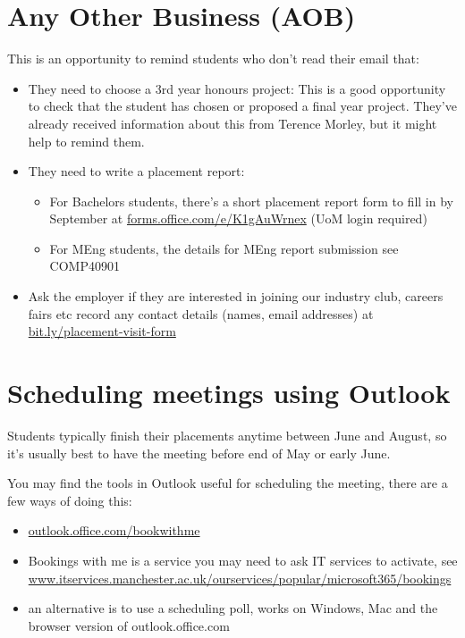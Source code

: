 \documentclass[
]{book}
\providecommand{\tightlist}{%
  \setlength{\itemsep}{0pt}\setlength{\parskip}{0pt}}
\begin{document}
\section{Any Other Business (AOB)}\label{aob}

This is an opportunity to remind students who don't read their email that:

\begin{itemize}
\tightlist
\item
  They need to choose a 3rd year honours project: This is a good opportunity to check that the student has chosen or proposed a final year project. They've already received information about this from Terence Morley, but it might help to remind them.
\item
  They need to write a placement report:

  \begin{itemize}
  \tightlist
  \item
    For Bachelors students, there's a short placement report form to fill in by September at \href{https://forms.office.com/e/K1gAuWrnex}{forms.office.com/e/K1gAuWrnex} (UoM login required)
  \item
    For MEng students, the details for MEng report submission see COMP40901
  \end{itemize}
\item
  Ask the employer if they are interested in joining our industry club, careers fairs etc record any contact details (names, email addresses) at \url{bit.ly/placement-visit-form}
\end{itemize}

\section{Scheduling meetings using Outlook}\label{schedule}

Students typically finish their placements anytime between June and August, so it's usually best to have the meeting before end of May or early June.

You may find the tools in Outlook useful for scheduling the meeting, there are a few ways of doing this:

\begin{itemize}
\tightlist
\item
  \href{https://outlook.office.com/bookwithme}{outlook.office.com/bookwithme}
\item
  Bookings with me is a service you may need to ask IT services to activate, see \href{https://www.itservices.manchester.ac.uk/ourservices/popular/microsoft365/bookings/}{www.itservices.manchester.ac.uk/ourservices/popular/microsoft365/bookings}
\item
  an alternative is to use a scheduling poll, works on Windows, Mac and the browser version of outlook.office.com \citep{poll}
\end{itemize}
\end{document}
